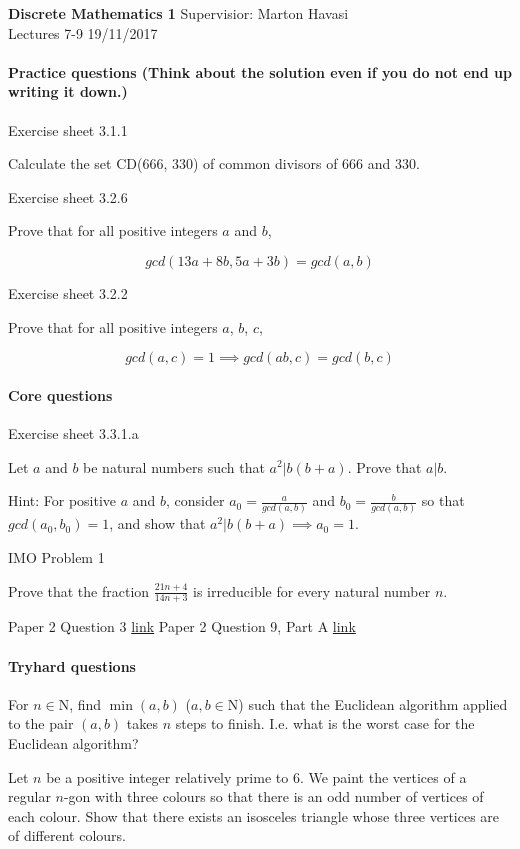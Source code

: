\documentclass{exam}
\begin{document}
\noindent
\large\textbf{Discrete Mathematics 1} \hfill Supervisior: Marton Havasi \\
\normalsize Lectures 7-9 \hfill 19/11/2017

\paragraph{Practice questions (Think about the solution even if you do not end up writing it down.)}
\begin{questions}
\question Exercise sheet 3.1.1

Calculate the set CD(666, 330) of common divisors of 666 and 330.

\question Exercise sheet 3.2.6

Prove that for all positive integers $a$ and $b$,

$$gcd(13a + 8b , 5a + 3b)=gcd(a, b)$$ 

\question Exercise sheet 3.2.2

Prove that for all positive integers $a$, $b$, $c$,

$$gcd(a, c) = 1 \implies gcd(a  b, c) = gcd(b, c)$$
\end{questions}

\paragraph{Core questions}
\begin{questions}
 
\question Exercise sheet 3.3.1.a

 Let $a$ and $b$ be natural numbers such that $a^2 | b(b + a)$. Prove that $a | b$.
 
Hint: For positive $a$ and $b$, consider $a_0 =\frac{a}{gcd(a,b)}$ and $b_0 = \frac{b}{gcd(a,b)}$ so that $gcd(a_0, b_0) = 1$, and show
that $a^2| b(b + a) \implies a_0 = 1$.

 IMO Problem 1

Prove that the fraction $\frac{21n+4}{14n+3}$ is irreducible for every natural number $n$.

 Paper 2 Question 3 \href{http://www.cl.cam.ac.uk/teaching/exams/pastpapers/y2007p2q3.pdf}{link}
 Paper 2 Question 9, Part A \href{http://www.cl.cam.ac.uk/teaching/exams/pastpapers/y2015p2q9.pdf}{link}

\end{questions}

\paragraph{Tryhard questions}
\begin{questions} 
\question  For $n \in \mathrm{N}$, find $\min (a,b)$ ($a, b \in \mathrm{N}$) such that the Euclidean algorithm applied to the pair $(a,b)$ takes $n$ steps to finish. I.e. what is the worst case for the Euclidean algorithm?
 
 \question Let $n$ be a positive integer relatively prime to 6. We paint the vertices of a regular $n$-gon with three colours so that there is an odd number of vertices of each colour. Show that there exists an isosceles triangle whose three vertices are of different colours.
\end{questions}
\end{document}
